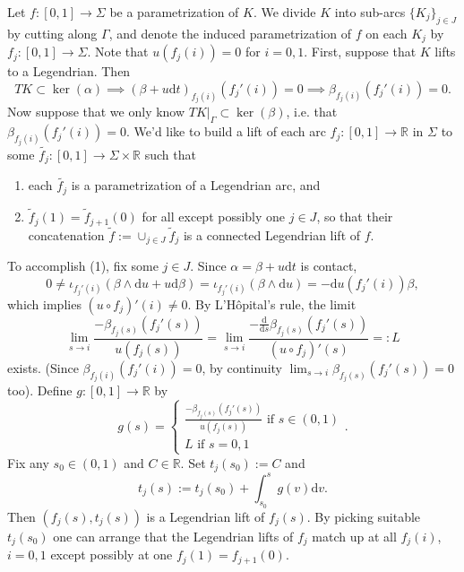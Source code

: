 \documentclass[11pt]{amsart}
\makeatletter
\renewenvironment{proof}[1][\proofname] {\par\pushQED{\qed}{\normalfont\bfseries\topsep6\p@\@plus6\p@\relax #1\@addpunct{.} }}{\popQED\endtrivlist\@endpefalse}
\theoremstyle{mystyle}
\newcommand{\R}{\mathbb{R}}
\newcommand{\de}{\text{d}}
\newcommand{\<}{\langle}
\renewcommand{\>}{\rangle}
\makeatother
\begin{document}
\begin{proof}
    Let $f:[0,1]\to \Sigma$ be a parametrization of $K$. We divide $K$ into sub-arcs $\{K_j\}_{j\in J}$ by cutting along $\Gamma$, and denote the induced parametrization of $f$ on each $K_j$ by $f_j:[0,1]\to \Sigma$. Note that $u(f_j(i))=0$ for $i=0,1$. First, suppose that $K$ lifts to a Legendrian. Then
    \[TK\subset \ker(\alpha)\implies (\beta+u\de t)_{f_j(i)}(f_j'(i))=0 \implies \beta_{f_j(i)}(f_j'(i))=0.\]
    Now suppose that we only know $TK|_\Gamma\subset \ker(\beta)$, i.e. that $\beta_{f_j(i)}(f_j'(i))=0$. We'd like to build a lift of each arc $f_j:[0,1]\to \R$ in $\Sigma$ to some $\tilde{f_j}:[0,1]\to \Sigma\times \R$ such that 
    \begin{enumerate}
        \item each $\tilde{f_j}$ is a parametrization of a Legendrian arc, and 
        \item $\tilde{f}_j(1)=\tilde{f}_{j+1}(0)$ for all except possibly one $j\in J$, so that their concatenation $\tilde{f} := \cup_{j\in J} \tilde{f}_j$ is a connected Legendrian lift of $f$.
    \end{enumerate}

    To accomplish (1), fix some $j\in J$. Since $\alpha = \beta+u\de t$ is contact, 
\[0 \neq \iota_{f_j'(i)}(\beta \wedge \de u + u\de \beta) = \iota_{f_j'(i)} (\beta \wedge \de u) = -\de u(f_j'(i))\beta,\] 
    which implies $(u \circ f_j)'(i) \neq 0$. By L'Hôpital's rule, the limit \[\lim_{s \rightarrow i} \frac{-\beta_{f_j(s)}(f_j'(s))}{u(f_j(s))} = \lim_{s \rightarrow i} \frac{-\frac{\de}{\de s} \beta_{f_j(s)}(f_j'(s))}{(u \circ f_j)'(s)} =: L\] exists. 
    (Since $\beta_{f_j(i)}(f_j'(i))=0$, by continuity $\lim_{s\to i}\beta_{f_j(s)}(f_j'(s))=0$ too).
    Define $g: [0, 1] \rightarrow \R$ by \[g(s) = \begin{cases}
        \frac{-\beta_{f_j(s)}(f_j'(s))}{u(f_j(s))} \text{ if } s \in (0, 1) \\
        L \text{ if } s = 0, 1
    \end{cases}.\]
    Fix any $s_0 \in (0, 1)$ and $C \in \R$. Set $t_j(s_0) := C$ and \[t_j(s) := t_j(s_0) + \int_{s_0}^s g(v) \de v.\] Then $(f_j(s), t_j(s))$ is a Legendrian lift of $f_j(s)$. By picking suitable $t_j(s_0)$ one can arrange that the Legendrian lifts of $f_j$ match up at all $f_j(i)$, $i = 0, 1$ except possibly at one $f_j(1) = f_{j+1}(0)$.
\end{proof}
\end{document}
